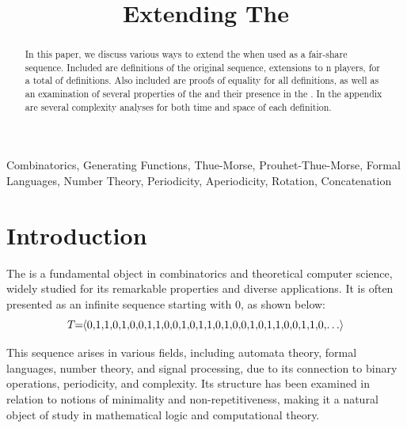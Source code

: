 \documentclass[conference]{IEEEtran}
\begin{document}
\title{Extending The \TMS}

\author{
}

\maketitle
\thispagestyle{plain}
\pagestyle{plain}

\begin{abstract}
In this paper, we discuss various ways to extend the \TMS \cite{OEIS-TMS} when used as a fair-share sequence. Included are \TotalOriginals definitions of the original sequence, \TotalExtensions extensions to n players, for a total of \TotalDefs definitions. Also included are proofs of equality for all definitions, as well as an examination of several properties of the \TMS and their presence in the \ETMS. In the appendix are several complexity analyses for both time and space of each definition.
\end{abstract}

\begin{IEEEkeywords}
Combinatorics, Generating Functions, Thue-Morse, Prouhet-Thue-Morse, Formal Languages, Number Theory, Periodicity, Aperiodicity, Rotation, Concatenation
\end{IEEEkeywords}

\section{Introduction}


The \TMS is a fundamental object in combinatorics and theoretical computer science, widely studied for its remarkable properties and diverse applications. It is often presented as an infinite sequence starting with 0, as shown below: \begin{equation*}
T\!\!=\!\!\tuple{0,\!1,\!1,\!0,\!1,\!0,\!0,\!1,\!1,\!0,\!0,\!1,\!0,\!1,\!1,\!0,\!1,\!0,\!0,\!1,\!0,\!1,\!1,\!0,\!0,\!1,\!1,\!0,\!\ldots}
\end{equation*}

This sequence arises in various fields, including automata theory, formal languages, number theory, and signal processing, due to its connection to binary operations, periodicity, and complexity. Its structure has been examined in relation to notions of minimality and non-repetitiveness, making it a natural object of study in mathematical logic and computational theory.
\end{document}
